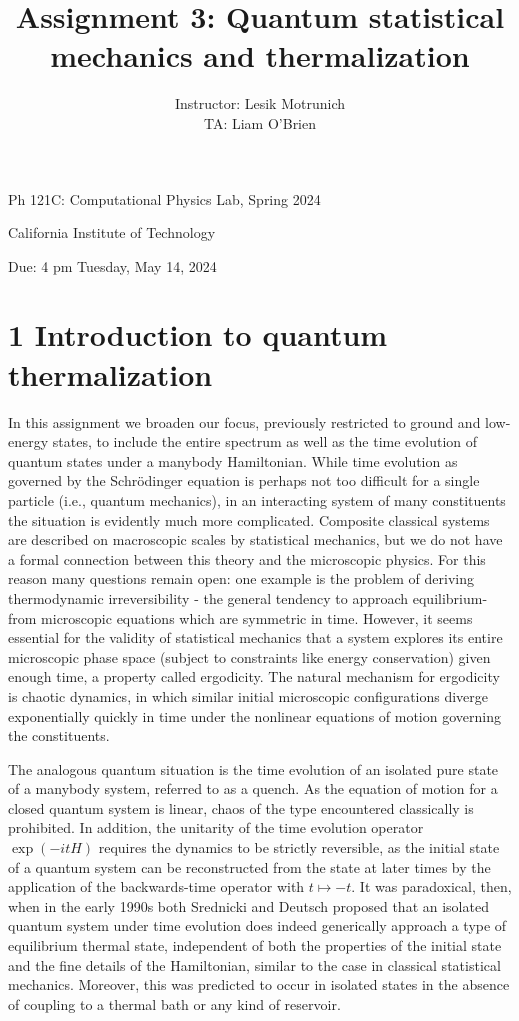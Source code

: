 \documentclass[12pt]{article}
\title{Assignment 3: Quantum statistical mechanics and thermalization }
\author{Instructor: Lesik Motrunich\\
TA: Liam O'Brien}
\date{}
\begin{document}
\maketitle
Ph 121C: Computational Physics Lab, Spring 2024

California Institute of Technology

Due: 4 pm Tuesday, May 14, 2024

\section*{1 Introduction to quantum thermalization}
In this assignment we broaden our focus, previously restricted to ground and low-energy states, to include the entire spectrum as well as the time evolution of quantum states under a manybody Hamiltonian. While time evolution as governed by the Schrödinger equation is perhaps not too difficult for a single particle (i.e., quantum mechanics), in an interacting system of many constituents the situation is evidently much more complicated. Composite classical systems are described on macroscopic scales by statistical mechanics, but we do not have a formal connection between this theory and the microscopic physics. For this reason many questions remain open: one example is the problem of deriving thermodynamic irreversibility - the general tendency to approach equilibrium-from microscopic equations which are symmetric in time. However, it seems essential for the validity of statistical mechanics that a system explores its entire microscopic phase space (subject to constraints like energy conservation) given enough time, a property called ergodicity. The natural mechanism for ergodicity is chaotic dynamics, in which similar initial microscopic configurations diverge exponentially quickly in time under the nonlinear equations of motion governing the constituents.

The analogous quantum situation is the time evolution of an isolated pure state of a manybody system, referred to as a quench. As the equation of motion for a closed quantum system is linear, chaos of the type encountered classically is prohibited. In addition, the unitarity of the time evolution operator $\exp (-i t H)$ requires the dynamics to be strictly reversible, as the initial state of a quantum system can be reconstructed from the state at later times by the application of the backwards-time operator with $t \mapsto-t$. It was paradoxical, then, when in the early 1990s both Srednicki and Deutsch proposed that an isolated quantum system under time evolution does indeed generically approach a type of equilibrium thermal state, independent of both the properties of the initial state and the fine details of the Hamiltonian, similar to the case in classical statistical mechanics. Moreover, this was predicted to occur in isolated states in the absence of coupling to a thermal bath or any kind of reservoir.
\end{document}
